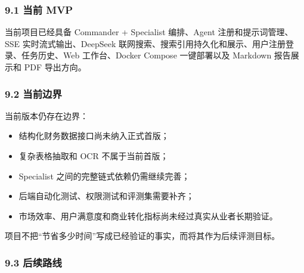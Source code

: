 \documentclass[a4paper,12pt,fontset=none]{ctexart}
\begin{document}
\subsubsection{9.1 当前 MVP}\label{ux5f53ux524d-mvp}

当前项目已经具备 Commander + Specialist 编排、Agent
注册和提示词管理、SSE 实时流式输出、DeepSeek
联网搜索、搜索引用持久化和展示、用户注册登录、任务历史、Web
工作台、Docker Compose 一键部署以及 Markdown 报告展示和 PDF 导出方向。

\subsubsection{9.2 当前边界}\label{ux5f53ux524dux8fb9ux754c}

当前版本仍存在边界：

\begin{itemize}
\tightlist
\item
  结构化财务数据接口尚未纳入正式首版；
\item
  复杂表格抽取和 OCR 不属于当前首版；
\item
  Specialist 之间的完整链式依赖仍需继续完善；
\item
  后端自动化测试、权限测试和评测集需要补齐；
\item
  市场效率、用户满意度和商业转化指标尚未经过真实从业者长期验证。
\end{itemize}

项目不把``节省多少时间''写成已经验证的事实，而将其作为后续评测目标。

\subsubsection{9.3 后续路线}\label{ux540eux7eedux8defux7ebf}
\end{document}
